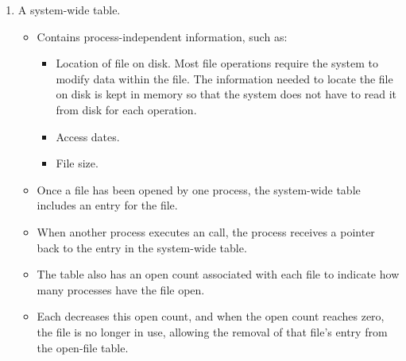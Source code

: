 \begin{enumerate}[noitemsep]
\item A system-wide table.
  \begin{itemize}[noitemsep]
  \item Contains process-independent information, such as:
    \begin{itemize}[noitemsep]
    \item Location of file on disk.
      Most file operations require the system to modify data within the file.
      The information needed to locate the file on disk is kept in memory so that the system does not have to read it from disk for each operation.
    \item Access dates.
    \item File size.
    \end{itemize}
  \item Once a file has been opened by one process, the system-wide table includes an entry for the file.
  \item When another process executes an  call, the process receives a pointer back to the entry in the system-wide table.
  \item The table also has an open count associated with each file to indicate how many processes have the file open.
  \item Each  decreases this open count, and when the open count reaches zero, the file is no longer in use, allowing the removal of that file’s entry from the open-file table.
  \end{itemize}
\end{enumerate}


